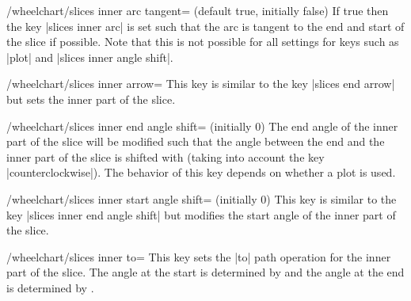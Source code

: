 \documentclass[a4paper,english,dvipsnames]{ltxdoc}
\begin{document}
\begin{key}{/wheelchart/slices inner arc tangent= (default true, initially false)}
If true then the key |slices inner arc| is set such that the arc is tangent to the end and start of the slice if possible. Note that this is not possible for all settings for keys such as |plot| and |slices inner angle shift|.
\begin{codeexample}[width=10cm]
\begin{tikzpicture}
\wheelchart[
  counterclockwise,
  data=,
  gap=0.1,
  middle=slices inner\\arc tangent,
  middle style={font=\ttfamily},
  slices inner arc tangent,
  slices style={
    draw=\WCvarB,
    fill=\WCvarB!50,
    ultra thick
  },
  value=1
]{\exampleforthismanual}
\end{tikzpicture}
\end{codeexample}
\end{key}
\begin{key}{/wheelchart/slices inner arrow=}
This key is similar to the key |slices end arrow| but sets the inner part of the slice.
\begin{codeexample}[width=10cm]
\end{codeexample}
\end{key}
\begin{key}{/wheelchart/slices inner end angle shift= (initially 0)}
The end angle of the inner part of the slice will be modified such that the angle between the end and the inner part of the slice is shifted with  (taking into account the key |counterclockwise|). The behavior of this key depends on whether a plot is used.
\end{key}
\begin{key}{/wheelchart/slices inner start angle shift= (initially 0)}
This key is similar to the key |slices inner end angle shift| but modifies the start angle of the inner part of the slice.
\end{key}
\begin{key}{/wheelchart/slices inner to=}
This key sets the |to| path operation for the inner part of the slice. The angle at the start is determined by  and the angle at the end is determined by .
\end{key}
\end{document}
